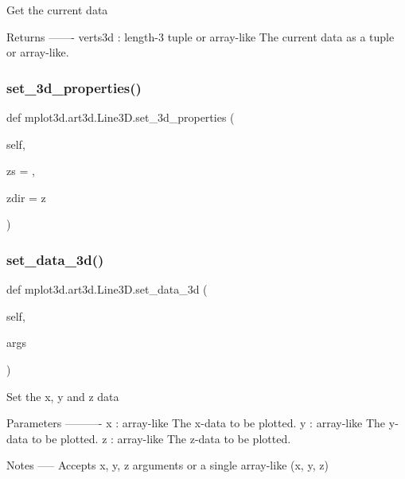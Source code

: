 \begin{DoxyVerb}Get the current data

Returns
-------
verts3d : length-3 tuple or array-like
    The current data as a tuple or array-like.
\end{DoxyVerb}
 \mbox{\label{classmplot3d_1_1art3d_1_1Line3D_a617721c7b5450e6dab10ceac5c925d5b}} 
\subsubsection{\texorpdfstring{set\+\_\+3d\+\_\+properties()}{set\_3d\_properties()}}
{\footnotesize\ttfamily def mplot3d.\+art3d.\+Line3\+D.\+set\+\_\+3d\+\_\+properties (\begin{DoxyParamCaption}\item[{}]{self,  }\item[{}]{zs = {},  }\item[{}]{zdir = {\ttfamily \textquotesingle{}z\textquotesingle{}} }\end{DoxyParamCaption})}

\mbox{\label{classmplot3d_1_1art3d_1_1Line3D_a75760a18ed269dbdbf35654a78993e35}} 
\subsubsection{\texorpdfstring{set\+\_\+data\+\_\+3d()}{set\_data\_3d()}}
{\footnotesize\ttfamily def mplot3d.\+art3d.\+Line3\+D.\+set\+\_\+data\+\_\+3d (\begin{DoxyParamCaption}\item[{}]{self,  }\item[{}]{args }\end{DoxyParamCaption})}

\begin{DoxyVerb}Set the x, y and z data

Parameters
----------
x : array-like
    The x-data to be plotted.
y : array-like
    The y-data to be plotted.
z : array-like
    The z-data to be plotted.

Notes
-----
Accepts x, y, z arguments or a single array-like (x, y, z)
\end{DoxyVerb}
 


